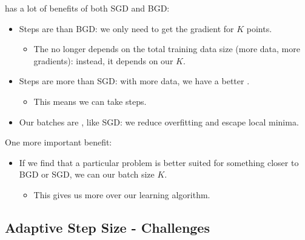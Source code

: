             \begin{concept}
                 has a lot of benefits of both SGD and BGD:
                
                \begin{itemize}
                    \item Steps are  than BGD: we only need to get the gradient for $K$ points.
                        \begin{itemize}
                            \item The  no longer depends on the total training data size (more data, more gradients): instead, it depends on our  $K$.
                        \end{itemize}
                        
                    \item Steps are more  than SGD: with more data, we have a better .
                        \begin{itemize}
                            \item This means we can take  steps.
                        \end{itemize}
                    
                    \item Our batches are , like SGD: we reduce overfitting and escape local minima.
                \end{itemize}

                \subsecdiv
                
                One more important benefit:
                
                \begin{itemize}
                    \item If we find that a particular problem is better suited for something closer to BGD or SGD, we can  our batch size $K$.
                        \begin{itemize}
                            \item This gives us more  over our learning algorithm.
                        \end{itemize}
                \end{itemize}
            \end{concept}
        
    \secdiv
    \pagebreak
    \subsection{Adaptive Step Size - Challenges}
    
